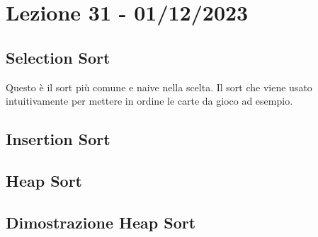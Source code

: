 \section{Lezione 31 - 01/12/2023} 
\subsection{Selection Sort}
Questo è il sort più comune e naive nella scelta. Il sort che viene usato intuitivamente per mettere in ordine le carte da gioco ad esempio.

\subsection{Insertion Sort}

\subsection{}

\subsection{Heap Sort}

\subsection{Dimostrazione Heap Sort}
